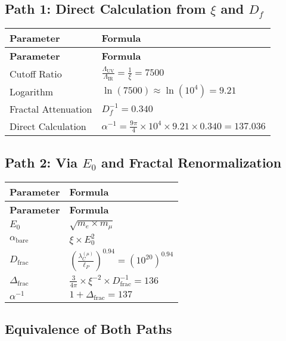 \documentclass[12pt,a4paper]{article}
\begin{document}
	\subsection{Path 1: Direct Calculation from \(\xi\) and \(D_f\)}
	
	\begin{longtable}{|p{4cm}|p{6cm}|}
		\hline
		\textbf{Parameter} & \textbf{Formula} \\
		\hline
		\endfirsthead
		\hline
		\textbf{Parameter} & \textbf{Formula} \\
		\hline
		\endhead
		Cutoff Ratio & \(\frac{\Lambda_{\text{UV}}}{\Lambda_{\text{IR}}} = \frac{1}{\xi} = 7500\) \\
		\hline
		Logarithm & \(\ln(7500) \approx \ln(10^4) = 9.21\) \\
		\hline
		Fractal Attenuation & \(D_f^{-1} = 0.340\) \\
		\hline
		Direct Calculation & \(\alpha^{-1} = \frac{9\pi}{4} \times 10^4 \times 9.21 \times 0.340 = 137.036\) \\
		\hline
	\end{longtable}
	
	\subsection{Path 2: Via \(E_0\) and Fractal Renormalization}
	
	\begin{longtable}{|p{3cm}|p{5cm}|}
		\hline
		\textbf{Parameter} & \textbf{Formula} \\
		\hline
		\endfirsthead
		\hline
		\textbf{Parameter} & \textbf{Formula} \\
		\hline
		\endhead
		\(E_0\) & \(\sqrt{m_e \times m_{\mu}}\) \\
		\hline
		\(\alpha_{\text{bare}}\) & \(\xi \times E_0^2\) \\
		\hline
		\(D_{\text{frac}}\) & \(\left(\frac{\lambda_C^{(\mu)}}{\ell_P}\right)^{0.94} = (10^{20})^{0.94}\) \\
		\hline
		\(\Delta_{\text{frac}}\) & \(\frac{3}{4\pi} \times \xi^{-2} \times D_{\text{frac}}^{-1} = 136\) \\
		\hline
		\(\alpha^{-1}\) & \(1 + \Delta_{\text{frac}} = 137\) \\
		\hline
	\end{longtable}
	
	\subsection{Equivalence of Both Paths}
	
\end{document}
